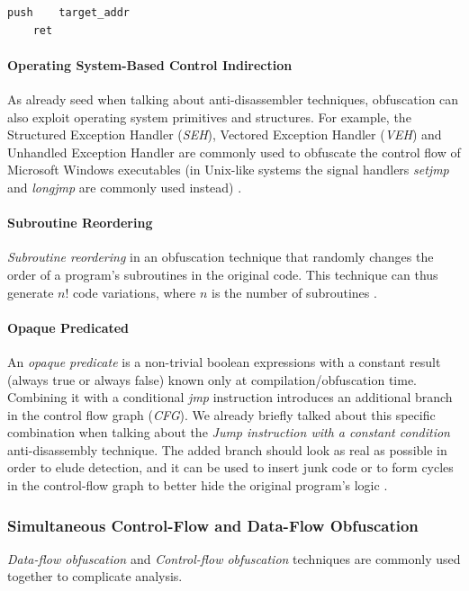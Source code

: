 \documentclass[pdfa%
,cucitura%
]{toptesi}
\begin{document}
\begin{lstlisting}[caption={Processor-based control indirection after}, label=code:ProcessorBasedControlIndirectionAfter, language={[x86masm]Assembler}, style=mystyle]
	push	target_addr
	ret
\end{lstlisting}

\paragraph{Operating System-Based Control Indirection}
As already seed when talking about anti-disassembler techniques, obfuscation can also exploit operating system primitives and structures. For example, the Structured Exception Handler (\textit{SEH}), Vectored Exception Handler (\textit{VEH}) and Unhandled Exception Handler are commonly used to obfuscate the control flow of Microsoft Windows executables (in Unix-like systems the signal handlers \textit{setjmp} and \textit{longjmp} are commonly used instead) \cite{DangPRE}.

\paragraph{Subroutine Reordering}
\textit{Subroutine reordering} in an obfuscation technique that randomly changes the order of a program's subroutines in the original code. This technique can thus generate $n!$ code variations, where $n$ is the number of subroutines \cite{YouMalwareOT}.

\paragraph{Opaque Predicated}
An \textit{opaque predicate} is a non-trivial boolean expressions with a constant result (always true or always false) known only at compilation/obfuscation time. Combining it with a conditional \textit{jmp} instruction introduces an additional branch in the control flow graph (\textit{CFG}). We already briefly talked about this specific combination when talking about the \textit{Jump instruction with a constant condition} anti-disassembly technique. The added branch should look as real as possible in order to elude detection, and it can be used to insert junk code or to form cycles in the control-flow graph to better hide the original program's logic \cite{DangPRE}.

\subsubsection{Simultaneous Control-Flow and Data-Flow Obfuscation}
\textit{Data-flow obfuscation} and \textit{Control-flow obfuscation} techniques are commonly used together to complicate analysis.
\end{document}
